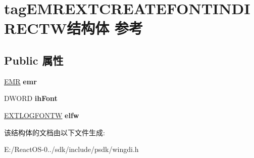 \hypertarget{structtag_e_m_r_e_x_t_c_r_e_a_t_e_f_o_n_t_i_n_d_i_r_e_c_t_w}{}\section{tag\+E\+M\+R\+E\+X\+T\+C\+R\+E\+A\+T\+E\+F\+O\+N\+T\+I\+N\+D\+I\+R\+E\+C\+T\+W结构体 参考}
\label{structtag_e_m_r_e_x_t_c_r_e_a_t_e_f_o_n_t_i_n_d_i_r_e_c_t_w}
\subsection*{Public 属性}
\begin{DoxyCompactItemize}
\item 
\mbox{\label{structtag_e_m_r_e_x_t_c_r_e_a_t_e_f_o_n_t_i_n_d_i_r_e_c_t_w_a9932b7bb95483c2bef08b9b66c9250f4}} 
\hyperlink{structtag_e_m_r}{E\+MR} {\bfseries emr}
\item 
\mbox{\label{structtag_e_m_r_e_x_t_c_r_e_a_t_e_f_o_n_t_i_n_d_i_r_e_c_t_w_a5a30305a207ad88a2b27742c6f04cc15}} 
D\+W\+O\+RD {\bfseries ih\+Font}
\item 
\mbox{\label{structtag_e_m_r_e_x_t_c_r_e_a_t_e_f_o_n_t_i_n_d_i_r_e_c_t_w_adba96a7f9cd98b1019b42a7a16d1d9c5}} 
\hyperlink{structtag_e_x_t_l_o_g_f_o_n_t_w}{E\+X\+T\+L\+O\+G\+F\+O\+N\+TW} {\bfseries elfw}
\end{DoxyCompactItemize}


该结构体的文档由以下文件生成\+:\begin{DoxyCompactItemize}
\item 
E\+:/\+React\+O\+S-\/0../sdk/include/psdk/wingdi.\+h\end{DoxyCompactItemize}
